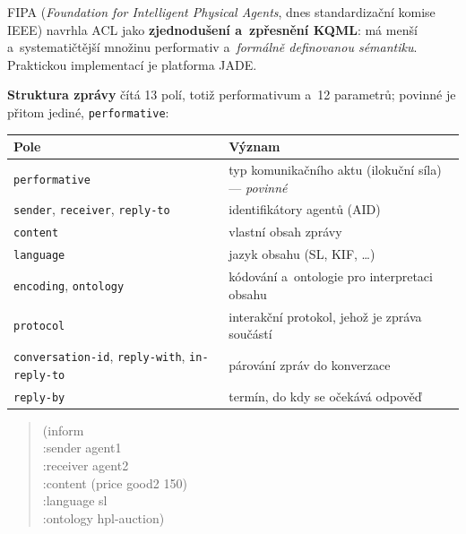 \documentclass[11pt,a4paper]{article}
\theoremstyle{definition}
\begin{document}
\begin{defbox}
FIPA (\emph{Foundation for Intelligent Physical Agents}, dnes standardizační komise IEEE)
navrhla ACL jako \textbf{zjednodušení a~zpřesnění KQML}: má menší a~systematičtější množinu
performativ a~\emph{formálně definovanou sémantiku}. Praktickou implementací je platforma JADE.

\textbf{Struktura zprávy} čítá 13 polí, totiž performativum a~12 parametrů; povinné je přitom
jediné, \texttt{performative}:
\begin{center}\small
\begin{tabular}{ll}
\toprule
\textbf{Pole} & \textbf{Význam} \\
\midrule
\texttt{performative} & typ komunikačního aktu (ilokuční síla) --- \emph{povinné} \\
\texttt{sender}, \texttt{receiver}, \texttt{reply-to} & identifikátory agentů (AID) \\
\texttt{content} & vlastní obsah zprávy \\
\texttt{language} & jazyk obsahu (SL, KIF, \dots) \\
\texttt{encoding}, \texttt{ontology} & kódování a~ontologie pro interpretaci obsahu \\
\texttt{protocol} & interakční protokol, jehož je zpráva součástí \\
\texttt{conversation-id}, \texttt{reply-with}, \texttt{in-reply-to} & párování zpráv do konverzace \\
\texttt{reply-by} & termín, do kdy se očekává odpověď \\
\bottomrule
\end{tabular}
\end{center}
\begin{quote}\small\ttfamily
(inform\\
\hspace*{1em}:sender agent1\\
\hspace*{1em}:receiver agent2\\
\hspace*{1em}:content (price good2 150)\\
\hspace*{1em}:language sl\\
\hspace*{1em}:ontology hpl-auction)
\end{quote}
\end{defbox}
\end{document}
